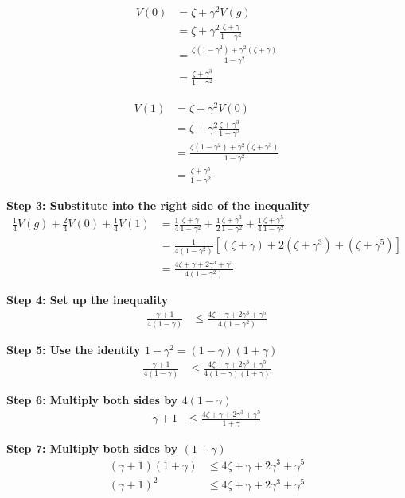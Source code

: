 \begin{align}
V(0) &= \zeta + \gamma^2V(g)\\
&= \zeta + \gamma^2 \frac{\zeta + \gamma}{1-\gamma^2}\\
&= \frac{\zeta(1-\gamma^2) + \gamma^2(\zeta + \gamma)}{1-\gamma^2}\\
&= \frac{\zeta + \gamma^3}{1-\gamma^2}
\end{align}

\begin{align}
V(1) &= \zeta + \gamma^2V(0)\\
&= \zeta + \gamma^2 \frac{\zeta + \gamma^3}{1-\gamma^2}\\
&= \frac{\zeta(1-\gamma^2) + \gamma^2(\zeta + \gamma^3)}{1-\gamma^2}\\
&= \frac{\zeta + \gamma^5}{1-\gamma^2}
\end{align}

\textbf{Step 3: Substitute into the right side of the inequality}
\begin{align}
\frac{1}{4}V(g) + \frac{2}{4}V(0) + \frac{1}{4}V(1) &= \frac{1}{4} \frac{\zeta + \gamma}{1-\gamma^2} + \frac{1}{2} \frac{\zeta + \gamma^3}{1-\gamma^2} + \frac{1}{4} \frac{\zeta + \gamma^5}{1-\gamma^2}\\
&= \frac{1}{4(1-\gamma^2)}[(\zeta + \gamma) + 2(\zeta + \gamma^3) + (\zeta + \gamma^5)]\\
&= \frac{4\zeta + \gamma + 2\gamma^3 + \gamma^5}{4(1-\gamma^2)}
\end{align}

\textbf{Step 4: Set up the inequality}
\begin{align}
\frac{\gamma + 1}{4(1-\gamma)} &\leq \frac{4\zeta + \gamma + 2\gamma^3 + \gamma^5}{4(1-\gamma^2)}
\end{align}

\textbf{Step 5: Use the identity $1-\gamma^2 = (1-\gamma)(1+\gamma)$}
\begin{align}
\frac{\gamma + 1}{4(1-\gamma)} &\leq \frac{4\zeta + \gamma + 2\gamma^3 + \gamma^5}{4(1-\gamma)(1+\gamma)}
\end{align}

\textbf{Step 6: Multiply both sides by $4(1-\gamma)$}
\begin{align}
\gamma + 1 &\leq \frac{4\zeta + \gamma + 2\gamma^3 + \gamma^5}{1+\gamma}
\end{align}

\textbf{Step 7: Multiply both sides by $(1+\gamma)$}
\begin{align}
(\gamma + 1)(1+\gamma) &\leq 4\zeta + \gamma + 2\gamma^3 + \gamma^5\\
(\gamma + 1)^2 &\leq 4\zeta + \gamma + 2\gamma^3 + \gamma^5
\end{align}

